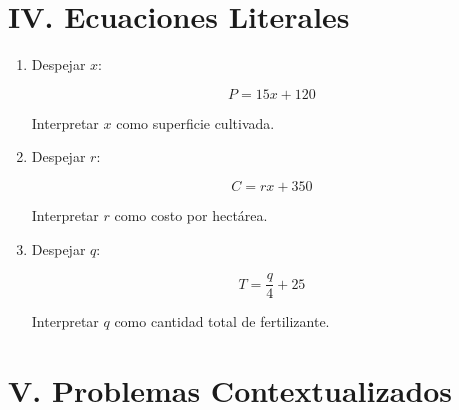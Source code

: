 \documentclass[11pt]{article}
\begin{document}
	\section*{IV. Ecuaciones Literales}
	
	\begin{enumerate}[label=\textbf{\arabic*.}, start=9]
		
		\item Despejar \(x\):
		
		\[
		P = 15x + 120
		\]
		
		Interpretar \(x\) como superficie cultivada.
		
		
		\item Despejar \(r\):
		
		\[
		C = rx + 350
		\]
		
		Interpretar \(r\) como costo por hectárea.
		
		
		\item Despejar \(q\):
		
		\[
		T = \frac{q}{4} + 25
		\]
		
		Interpretar \(q\) como cantidad total de fertilizante.
		
	\end{enumerate}
	
	\newpage
	\vspace*{0.2cm}
	
	\section*{V. Problemas Contextualizados}
	
\end{document}
